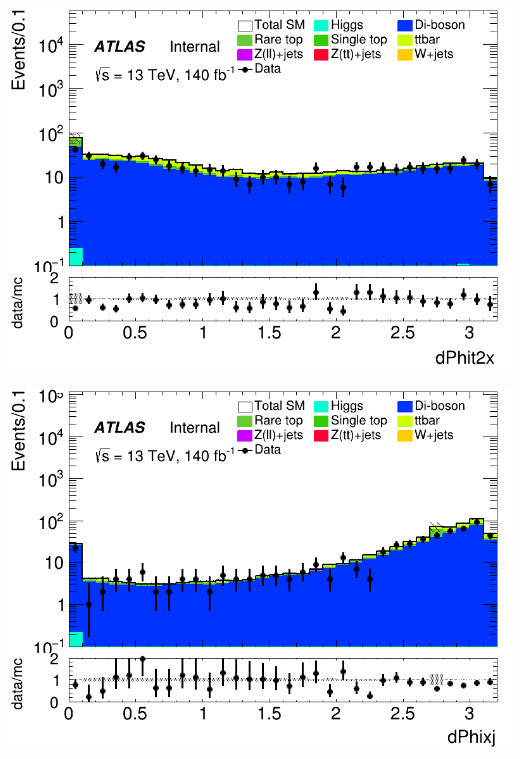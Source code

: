 \documentclass[usenames,dvipsnames]{beamer}
\begin{document}
\begin{frame}
    \begin{minipage}{0.32\textwidth}
        \centering
        \includegraphics[width=\textwidth]{graphics/LLL_met/LLL_met_dPhit2x.png}
    \end{minipage}
    \hfill
    \begin{minipage}{0.32\textwidth}
        \centering
        \includegraphics[width=\textwidth]{graphics/LLL_met/LLL_met_dPhixj.png}
    \end{minipage}
    \hfill
    \begin{minipage}{0.32\textwidth}
        \centering

\end{minipage}
\end{frame}
\end{document}
